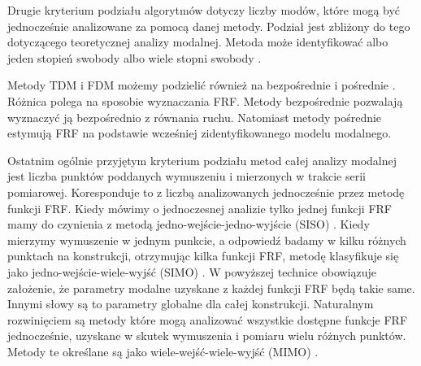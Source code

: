 Drugie kryterium podziału algorytmów dotyczy liczby modów, które mogą być jednocześnie analizowane za pomocą danej metody. Podział jest zbliżony do tego dotyczącego teoretycznej analizy modalnej. Metoda może identyfikować albo jeden stopień swobody  albo wiele stopni swobody .

Metody TDM i FDM możemy podzielić również na bezpośrednie  i pośrednie . Różnica polega na sposobie wyznaczania FRF. Metody bezpośrednie pozwalają wyznaczyć ją bezpośrednio z równania ruchu. Natomiast metody pośrednie estymują FRF na podstawie wcześniej zidentyfikowanego modelu modalnego.

Ostatnim ogólnie przyjętym kryterium podziału metod całej analizy modalnej jest liczba punktów poddanych wymuszeniu i mierzonych w trakcie serii pomiarowej. Koresponduje to z liczbą analizowanych jednocześnie przez metodę funkcji FRF. Kiedy mówimy o jednoczesnej analizie tylko jednej funkcji FRF mamy do czynienia z metodą jedno-wejście-jedno-wyjście (SISO) . Kiedy mierzymy wymuszenie w jednym punkcie, a odpowiedź badamy w kilku różnych punktach na konstrukcji, otrzymując kilka funkcji FRF, metodę klasyfikuje się jako jedno-wejście-wiele-wyjść (SIMO) . W powyższej technice obowiązuje założenie, że parametry modalne uzyskane z każdej funkcji FRF będą takie same. Innymi słowy są to parametry globalne dla całej konstrukcji. Naturalnym rozwinięciem są metody które mogą analizować wszystkie dostępne funkcje FRF jednocześnie, uzyskane w skutek wymuszenia i pomiaru wielu różnych punktów. Metody te określane są jako wiele-wejść-wiele-wyjść (MIMO) .


